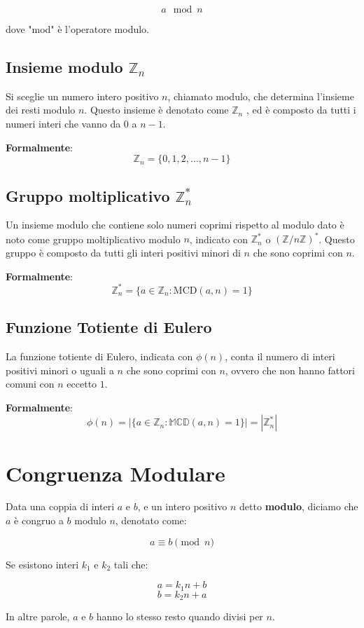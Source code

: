 \documentclass[a4paper,12pt]{report}
\begin{document}
\[ a \mod n \]

dove "mod" è l'operatore modulo.

\subsection*{Insieme modulo \( \mathbb{Z}_n\)}
Si sceglie un numero intero positivo \(n\), chiamato modulo, che determina l'insieme dei resti modulo \(n\). 
Questo insieme è denotato come \(\mathbb{Z}_n\)  , ed è composto da tutti i numeri interi che vanno da 0 a \(n-1\).

\textbf{Formalmente}: \[\mathbb{Z}_n = \{0, 1, 2, \ldots, n-1\}\]

\subsection*{Gruppo moltiplicativo \(\mathbb{Z}_n^*\)}
Un insieme modulo che contiene solo numeri coprimi rispetto al modulo dato è noto come gruppo moltiplicativo modulo \(n\), indicato con \(\mathbb{Z}_n^*\) o \((\mathbb{Z}/n\mathbb{Z})^*\). 
Questo gruppo è composto da tutti gli interi positivi minori di \(n\) che sono coprimi con \(n\).

\textbf{Formalmente}: \[\mathbb{Z}_n^* = \{a \in \mathbb{Z}_n : \text{MCD}(a, n) = 1\}\]

\subsection*{Funzione Totiente di Eulero} \label{sec:totiente}
La funzione totiente di Eulero, indicata con $\phi(n)$, conta il numero di interi positivi minori o uguali a $n$ che sono coprimi con $n$, ovvero che non hanno fattori comuni con $n$ eccetto $1$. 

\textbf{Formalmente}:\[\phi(n) = |\{a \in \mathbb{Z}_n : \mathbb{MCD}(a, n) = 1\}| = |\mathbb{Z}_n^*|\]
\section{Congruenza Modulare}

Data una coppia di interi $a$ e $b$, e un intero positivo $n$ detto \textbf{modulo}, diciamo che $a$ è congruo a $b$ modulo $n$, denotato come:

$$a \equiv b \pmod{n}$$

Se esistono interi $k_1$ e $k_2$ tali che:

$$a = k_1n + b$$
$$b = k_2n + a$$

In altre parole, $a$ e $b$ hanno lo stesso resto quando divisi per $n$. 
\end{document}
